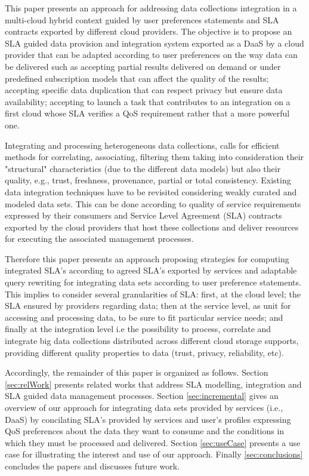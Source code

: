 This paper presents an approach for addressing  data collections integration  in a multi-cloud hybrid context guided by user preferences statements and SLA contracts exported by different cloud providers. The objective is to propose an SLA guided  data provision and integration system exported as a DaaS by a cloud provider that can be adapted according to user preferences on the way data can be delivered  such as accepting partial results delivered on demand or under predefined subscription models that can affect the quality of the results; accepting specific data duplication that can respect privacy but ensure data availability; accepting to launch a task that contributes to an integration on a first cloud whose SLA verifies a QoS requirement rather that a more powerful one.  

Integrating and processing heterogeneous data collections, calls for efficient methods for correlating, associating, filtering them taking into consideration their "structural" characteristics (due to the different data models) but also their quality, e.g., trust, freshness, provenance, partial or total consistency. 
Existing data integration techniques have to be revisited considering weakly curated and modeled data sets. This can be done according to quality of service requirements expressed by their consumers and Service Level Agreement (SLA) contracts exported by the cloud providers that host  these collections and deliver resources for executing the associated management processes.


Therefore this paper presents an approach proposing strategies for computing integrated SLA's according to agreed SLA's exported by services  and adaptable query rewriting for integrating data sets  according to user preference statements.
This implies to consider several granularities of SLA: first, at the cloud level; the SLA ensured by providers regarding data; then at the service level, as unit for accessing and processing data, to be sure to fit particular service needs; and finally at the integration level i.e the possibility to process, correlate and integrate big data collections distributed across different cloud storage supports, providing different quality properties to data (trust, privacy, reliability, etc).
 
 
Accordingly, the remainder of this paper is organized as follows. Section \ref{sec:relWork} presents related works that address SLA modelling, integration and SLA guided data management processes. Section \ref{sec:incremental} gives an overview of our approach for integrating data sets provided by services (i.e., DaaS) by concilating SLA's provided by services and user's profiles expressing QoS preferences about the data they want to consume and the conditions in which they must be processed and delivered. 
Section \ref{sec:useCase} presents a use case for illustrating the interest and use of our approach. 
Finally \ref{sec:conclusions} concludes the papers and discusses future work.
